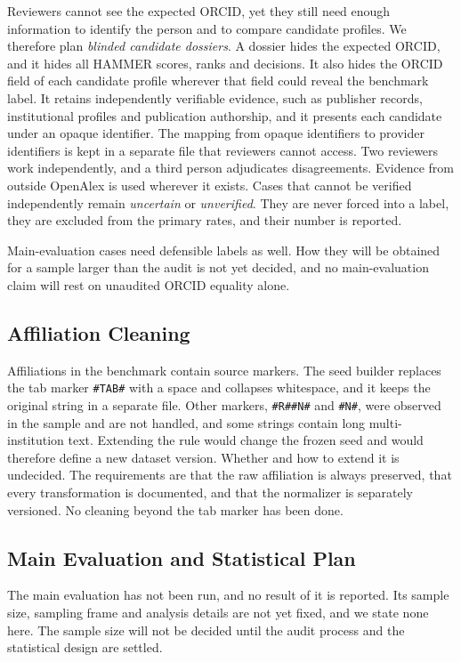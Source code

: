 Reviewers cannot see the expected ORCID, yet they still need enough information to identify the person and to compare candidate profiles. We therefore plan \emph{blinded candidate dossiers}. A dossier hides the expected ORCID, and it hides all HAMMER scores, ranks and decisions. It also hides the ORCID field of each candidate profile wherever that field could reveal the benchmark label. It retains independently verifiable evidence, such as publisher records, institutional profiles and publication authorship, and it presents each candidate under an opaque identifier. The mapping from opaque identifiers to provider identifiers is kept in a separate file that reviewers cannot access. Two reviewers work independently, and a third person adjudicates disagreements. Evidence from outside OpenAlex is used wherever it exists. Cases that cannot be verified independently remain \emph{uncertain} or \emph{unverified}. They are never forced into a label, they are excluded from the primary rates, and their number is reported.

Main-evaluation cases need defensible labels as well. How they will be obtained for a sample larger than the audit is not yet decided, and no main-evaluation claim will rest on unaudited ORCID equality alone.

\subsection{Affiliation Cleaning}
\label{sec:affiliation}
Affiliations in the benchmark contain source markers. The seed builder replaces the tab marker \texttt{\#TAB\#} with a space and collapses whitespace, and it keeps the original string in a separate file. Other markers, \texttt{\#R\#\#N\#} and \texttt{\#N\#}, were observed in the sample and are not handled, and some strings contain long multi-institution text. Extending the rule would change the frozen seed and would therefore define a new dataset version. Whether and how to extend it is undecided. The requirements are that the raw affiliation is always preserved, that every transformation is documented, and that the normalizer is separately versioned. No cleaning beyond the tab marker has been done.

\subsection{Main Evaluation and Statistical Plan}
\label{sec:main}
The main evaluation has not been run, and no result of it is reported. Its sample size, sampling frame and analysis details are not yet fixed, and we state none here. The sample size will not be decided until the audit process and the statistical design are settled.

